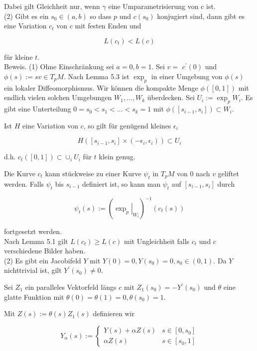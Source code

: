 \documentclass[10pt]{article}
\begin{document}
Dabei gilt Gleichheit nur, wenn $\gamma$ eine Umparametrisierung von c ist.\\
(2) Gibt es ein $s_{0} \in(a, b)$ so dass $p$ und $c\left(s_{0}\right)$ konjugiert sind, dann gibt es eine Variation $c_{t}$ von $c$ mit festen Enden und

$$
L\left(c_{t}\right)<L(c)
$$

für kleine $t$.\\
Beweis. (1) Ohne Einschränkung sei $a=0, b=1$. Sei $v=$ $c^{\prime}(0)$ und $\phi(s):=s v \in T_{p} M$. Nach Lemma 5.3 ist $\exp _{p}$ in einer Umgebung von $\phi(s)$ ein lokaler Diffeomorphismus. Wir können die kompakte Menge $\phi([0,1])$ mit endlich vielen solchen Umgebungen $W_{1}, \ldots, W_{k}$ überdecken. Sei $U_{i}:=\exp _{p} W_{i}$. Es gibt eine Unterteilung $0=s_{0}<s_{1}<\ldots<s_{k}=1$ mit $\phi\left(\left[s_{i-1}, s_{i}\right]\right) \subset W_{i}$.

Ist $H$ eine Variation von $c$, so gilt für genügend kleines $\epsilon_{i}$

$$
H\left(\left[s_{i-1}, s_{i}\right] \times\left(-\epsilon_{i}, \epsilon_{i}\right)\right) \subset U_{i}
$$

d.h. $c_{t}([0,1]) \subset \cup_{i} U_{i}$ für $t$ klein genug.

Die Kurve $c_{t}$ kann stückweise zu einer Kurve $\psi_{t}$ in $T_{p} M$ von 0 nach $v$ geliftet werden. Falls $\psi_{t}$ bis $s_{i-1}$ definiert ist, so kann man $\psi_{t}$ auf $\left[s_{i-1}, s_{i}\right]$ durch

$$
\psi_{t}(s):=\left(\left.\exp _{p}\right|_{W_{i}}\right)^{-1}\left(c_{t}(s)\right)
$$

fortgesetzt werden.\\
Nach Lemma 5.1 gilt $L\left(c_{t}\right) \geq L(c)$ mit Ungleichheit falls $c_{t}$ und $c$ verschiedene Bilder haben.\\
(2) Es gibt ein Jacobifeld $Y$ mit $Y(0)=0, Y\left(s_{0}\right)=0, s_{0} \in(0,1)$. Da $Y$ nichttrivial ist, gilt $Y^{\prime}\left(s_{0}\right) \neq 0$.

Sei $Z_{1}$ ein paralleles Vektorfeld längs $c$ mit $Z_{1}\left(s_{0}\right)=-Y^{\prime}\left(s_{0}\right)$ und $\theta$ eine glatte Funktion mit $\theta(0)=\theta(1)=0, \theta\left(s_{0}\right)=1$.

Mit $Z(s):=\theta(s) Z_{1}(s)$ definieren wir

$$
Y_{\alpha}(s):=\left\{\begin{array}{cl}
Y(s)+\alpha Z(s) & s \in\left[0, s_{0}\right] \\
\alpha Z(s) & s \in\left[s_{0}, 1\right]
\end{array}\right.
$$
\end{document}
